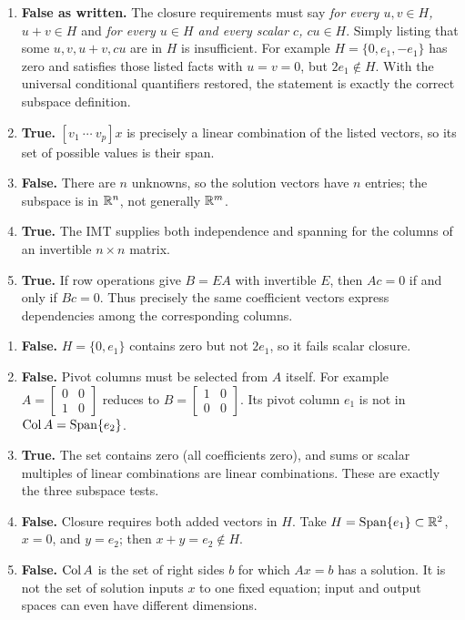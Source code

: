 \begin{enumerate}[label=(\alph*)]
\item \textbf{False as written.} The closure requirements must say
\emph{for every $u,v\in H$, $u+v\in H$} and
\emph{for every $u\in H$ and every scalar $c$, $cu\in H$}.
Simply listing that some $u,v,u+v,cu$ are in $H$ is insufficient.
For example $H=\{0,e_1,-e_1\}$ has zero and satisfies those listed facts
with $u=v=0$, but $2e_1\notin H$.
With the universal conditional quantifiers restored, the statement is
exactly the correct subspace definition.
\item \textbf{True.} $[v_1\ \cdots\ v_p]x$ is precisely a linear
combination of the listed vectors, so its set of possible values is their span.
\item \textbf{False.} There are $n$ unknowns, so the solution vectors
have $n$ entries; the subspace is in $\mathbb{R}^n$, not generally $\mathbb{R}^m$.
\item \textbf{True.} The IMT supplies both independence and spanning
for the columns of an invertible $n\times n$ matrix.
\item \textbf{True.} If row operations give $B=EA$ with invertible $E$,
then $Ac=0$ if and only if $Bc=0$. Thus precisely the same coefficient
vectors express dependencies among the corresponding columns.
\end{enumerate}

\begin{enumerate}[label=(\alph*)]
\item \textbf{False.} $H=\{0,e_1\}$ contains zero but not $2e_1$,
so it fails scalar closure.
\item \textbf{False.} Pivot columns must be selected from $A$ itself.
For example $A=\begin{bmatrix}0&0\\1&0\end{bmatrix}$ reduces to
$B=\begin{bmatrix}1&0\\0&0\end{bmatrix}$. Its pivot column $e_1$
is not in $\operatorname{Col} A=\operatorname{Span}\{e_2\}$.
\item \textbf{True.} The set contains zero (all coefficients zero),
and sums or scalar multiples of linear combinations are linear combinations.
These are exactly the three subspace tests.
\item \textbf{False.} Closure requires both added vectors in $H$.
Take $H=\operatorname{Span}\{e_1\}\subset\mathbb{R}^2$, $x=0$, and $y=e_2$;
then $x+y=e_2\notin H$.
\item \textbf{False.} $\operatorname{Col} A$ is the set of right sides $b$ for which
$Ax=b$ has a solution. It is not the set of solution inputs $x$ to one
fixed equation; input and output spaces can even have different dimensions.
\end{enumerate}


